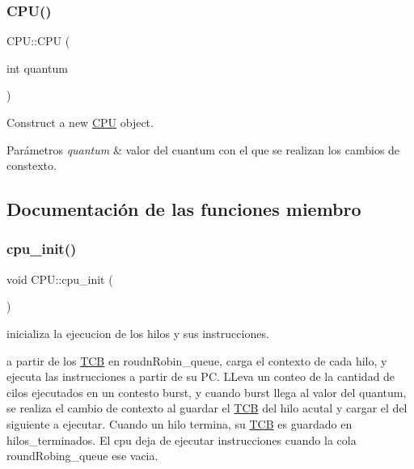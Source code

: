 \subsubsection{\texorpdfstring{C\+P\+U()}{CPU()}}
{\footnotesize\ttfamily C\+P\+U\+::\+C\+PU (\begin{DoxyParamCaption}\item[{int}]{quantum }\end{DoxyParamCaption})}



Construct a new \hyperlink{classCPU}{C\+PU} object. 


\begin{DoxyParams}{Parámetros}
{\em quantum} & valor del cuantum con el que se realizan los cambios de constexto. \\
\hline
\end{DoxyParams}


\subsection{Documentación de las funciones miembro}
\mbox{\label{classCPU_a06f4d0b7369cb2520e7795a77d18887d}} 
\subsubsection{\texorpdfstring{cpu\+\_\+init()}{cpu\_init()}}
{\footnotesize\ttfamily void C\+P\+U\+::cpu\+\_\+init (\begin{DoxyParamCaption}{ }\end{DoxyParamCaption})}



inicializa la ejecucion de los hilos y sus instrucciones. 

a partir de los \hyperlink{structTCB}{T\+CB} en roudn\+Robin\+\_\+queue, carga el contexto de cada hilo, y ejecuta las instrucciones a partir de su PC. L\+Leva un conteo de la cantidad de cilos ejecutados en un contesto burst, y cuando burst llega al valor del quantum, se realiza el cambio de contexto al guardar el \hyperlink{structTCB}{T\+CB} del hilo acutal y cargar el del siguiente a ejecutar. Cuando un hilo termina, su \hyperlink{structTCB}{T\+CB} es guardado en hilos\+\_\+terminados. El cpu deja de ejecutar instrucciones cuando la cola round\+Robing\+\_\+queue ese vacia. \mbox{\label{classCPU_acbee1b754fbf381f3fa08cf3f3c1a489}} 

